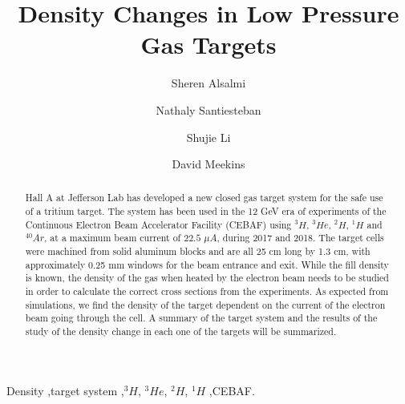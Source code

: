 \documentclass[preprint,12pt]{elsarticle}
\begin{document}
\begin{frontmatter}



\title{Density Changes in Low Pressure Gas Targets}

\author[Kent]{Sheren Alsalmi}
\author[UNH]{Nathaly Santiesteban}
\author[UNH]{Shujie Li}
\author[JLab]{David Meekins}

\address[Kent]{Kent State University}
\address[UNH]{University of New Hampshire}
\address[JLab]{Jefferson Lab}

\begin{abstract}

Hall A at Jefferson Lab has developed a new closed gas target system for the safe use of a tritium target. The system has been used in the 12 GeV era of experiments of the Continuous Electron Beam Accelerator Facility (CEBAF) using $^{3}H$, $^{3}He$, $^{2}H$, $^{1}H$ and $^{40}Ar$, at a maximum beam current of 
$22.5$ $\mu A$, during 2017 and 2018. The target cells were machined from solid  aluminum blocks and are all 25 cm long by 1.3 cm, with approximately 0.25 mm  windows for the beam entrance and exit. While the fill density is known, the  density of the gas when heated by the electron beam needs to be studied in 
order to calculate the correct cross sections from the experiments. As expected  from simulations, we find the density of the target dependent on the current of the electron beam going through the cell. A summary of the target system and the results of the study of the density change in each one of the targets will be summarized.

\end{abstract}

\begin{keyword}
Density
\sep target system
\sep $^{3}H$, $^{3}He$, $^{2}H$, $^{1}H$
\sep CEBAF.


\end{keyword}
\end{frontmatter}
\end{document}
